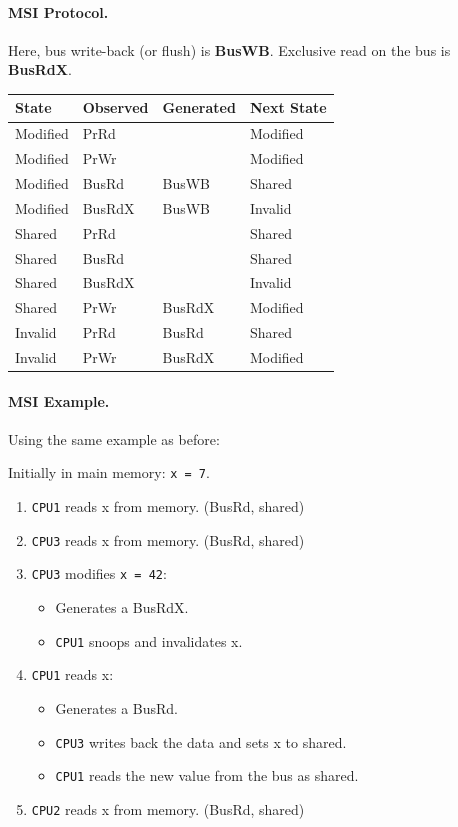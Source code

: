 \documentclass[a4paper]{report}
\begin{document}
\paragraph{MSI Protocol.} Here, bus write-back (or flush) is {\bf BusWB}.
Exclusive read on the bus is {\bf BusRdX}.

\begin{center}
    \begin{tabular}{l|l|l|l}
      {\bf State} & {\bf Observed} & {\bf Generated} & {\bf Next State}\\ \hline
      Modified   & PrRd   &        & Modified\\
      Modified   & PrWr   &        & Modified\\
      Modified   & BusRd  & BusWB  & Shared\\
      Modified   & BusRdX & BusWB  & Invalid\\
      Shared     & PrRd   &        & Shared\\
      Shared     & BusRd  &        & Shared\\
      Shared     & BusRdX &        & Invalid\\
      Shared     & PrWr   & BusRdX & Modified\\
      Invalid    & PrRd   & BusRd  & Shared\\
      Invalid    & PrWr   & BusRdX & Modified\\
    \end{tabular}
\end{center}

\paragraph{MSI Example.} Using the same example as before:

Initially in main memory: {\tt x = 7}.

  \begin{enumerate}
    \item {\tt CPU1} reads x from memory. {(BusRd, shared)}
    \item {\tt CPU3} reads x from memory. {(BusRd, shared)}
    \item {\tt CPU3} modifies {\tt x = 42}:
      \begin{itemize}
        \item {Generates a BusRdX.}
        \item {{\tt CPU1} snoops and invalidates x.}
      \end{itemize}
    \item {\tt CPU1} reads x:
      \begin{itemize}
        \item {Generates a BusRd.}
        \item {{\tt CPU3} writes back the data and sets x to shared.}
        \item {{\tt CPU1} reads the new value from the bus as shared.}
      \end{itemize}
    \item {\tt CPU2} reads x from memory. {(BusRd, shared)}
  \end{enumerate}
\end{document}

